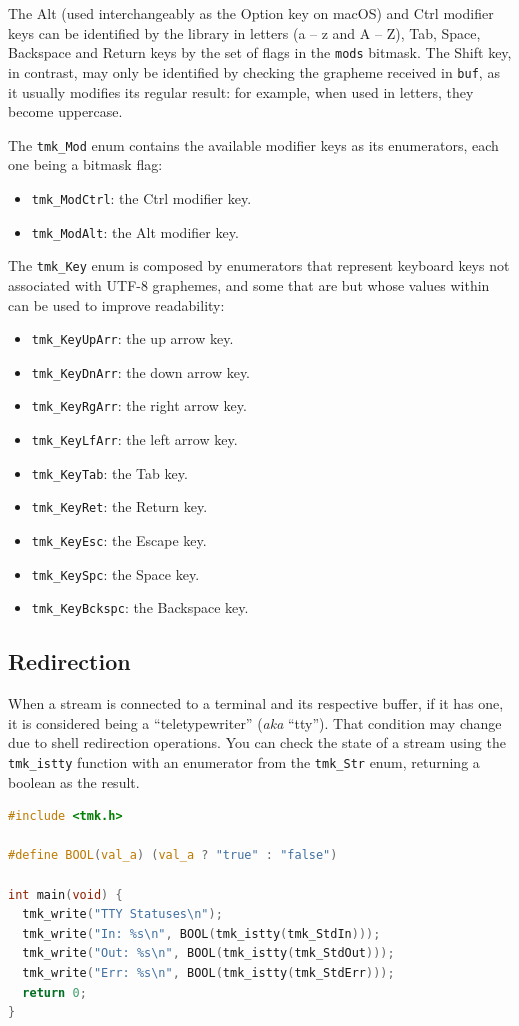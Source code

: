 \documentclass{report}
\begin{document}
The Alt (used interchangeably as the Option key on macOS) and Ctrl modifier keys can be identified by the library in letters (a – z and A – Z), Tab, Space, Backspace and Return keys by the set of flags in the \texttt{mods} bitmask. The Shift key, in contrast, may only be identified by checking the grapheme received in \texttt{buf}, as it usually modifies its regular result: for example, when used in letters, they become uppercase.

The \texttt{tmk\_Mod} enum contains the available modifier keys as its enumerators, each one being a bitmask flag:
\begin{itemize}
  \item \texttt{tmk\_ModCtrl}: the Ctrl modifier key.
  \item \texttt{tmk\_ModAlt}: the Alt modifier key.
\end{itemize}

The \texttt{tmk\_Key} enum is composed by enumerators that represent keyboard keys not associated with UTF-8 graphemes, and some that are but whose values within can be used to improve readability:
\begin{itemize}
  \item \texttt{tmk\_KeyUpArr}: the up arrow key.
  \item \texttt{tmk\_KeyDnArr}: the down arrow key.
  \item \texttt{tmk\_KeyRgArr}: the right arrow key.
  \item \texttt{tmk\_KeyLfArr}: the left arrow key.
  \item \texttt{tmk\_KeyTab}: the Tab key.
  \item \texttt{tmk\_KeyRet}: the Return key.
  \item \texttt{tmk\_KeyEsc}: the Escape key.
  \item \texttt{tmk\_KeySpc}: the Space key.
  \item \texttt{tmk\_KeyBckspc}: the Backspace key.
\end{itemize}
\subsection{Redirection}
When a stream is connected to a terminal and its respective buffer, if it has one, it is considered being a ``teletypewriter'' (\textit{aka} ``tty''). That condition may change due to shell redirection operations. You can check the state of a stream using the \texttt{tmk\_istty} function with an enumerator from the \texttt{tmk\_Str} enum, returning a boolean as the result.
\begin{lstlisting}[language=c,caption=an example that checks if each stream is a tty.]
#include <tmk.h>

#define BOOL(val_a) (val_a ? "true" : "false")

int main(void) {
  tmk_write("TTY Statuses\n");
  tmk_write("In: %s\n", BOOL(tmk_istty(tmk_StdIn)));
  tmk_write("Out: %s\n", BOOL(tmk_istty(tmk_StdOut)));
  tmk_write("Err: %s\n", BOOL(tmk_istty(tmk_StdErr)));
  return 0;
}
\end{lstlisting}
\end{document}
